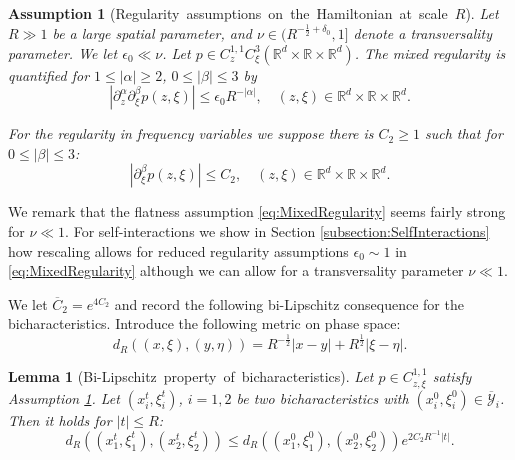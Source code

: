 \documentclass{amsart}
\newtheorem{lemma}[theorem]{Lemma}
\newtheorem{assumption}[theorem]{Assumption}
\theoremstyle{definition}
\newcommand{\R}{\mathbb{R}}
\begin{document}
\begin{assumption}[Regularity~assumptions~on~the~Hamiltonian~at~scale~$R$]
\label{ass:RegularityFlow}
Let $R \gg 1$ be a large spatial parameter, and $\nu \in (R^{-\frac{1}{2}+\delta_0},1]$ denote a transversality parameter. We let $\epsilon_0 \ll \nu$.
Let $p \in C_{z}^{1,1} C_{\xi}^3(\R^d \times \R \times \R^d)$. The mixed regularity is quantified for $1 \leq |\alpha| \geq 2$, $0 \leq |\beta| \leq 3$ by
\begin{equation}
\label{eq:MixedRegularity}
|\partial_z^\alpha \partial_\xi^{\beta} p(z,\xi)| \leq \epsilon_0 R^{-|\alpha|}, \quad (z,\xi) \in \R^d \times \R \times \R^d.
\end{equation}

For the regularity in frequency variables we suppose there is $C_2 \geq 1$ such that for $0 \leq |\beta| \leq 3$:
\begin{equation}
\label{eq:XiRegularity}
|\partial_{\xi}^{\beta} p(z,\xi)| \leq C_2, \quad (z,\xi) \in \R^d \times \R \times \R^d.
\end{equation}
\end{assumption}

We remark that the flatness assumption \eqref{eq:MixedRegularity} seems fairly strong for $\nu \ll 1$. For self-interactions we show in Section \ref{subsection:SelfInteractions} how rescaling allows for reduced regularity assumptions $\epsilon_0 \sim 1$ in \eqref{eq:MixedRegularity} although we can allow for a transversality parameter $\nu \ll 1$.

We let $\overline{C}_2 = e^{4 C_2}$ and record the following bi-Lipschitz consequence for the bicharacteristics. Introduce the following metric on phase space:
\begin{equation*}
    d_R((x,\xi),(y,\eta)) = R^{-\frac{1}{2}} |x-y| + R^{\frac{1}{2}} |\xi - \eta|.
\end{equation*}


\begin{lemma}[Bi-Lipschitz~property~of~bicharacteristics]
\label{lem:GeometryWavepackets}
Let $p \in C_{z,\xi}^{1,1}$ satisfy Assumption \ref{ass:RegularityFlow}. Let $(x_i^t,\xi_i^t)$, $i=1,2$ be two bicharacteristics with $(x_i^0,\xi_i^0) \in \overline{\mathcal{Y}}_i$.
Then it holds for $|t| \leq R$:
\begin{equation*}
d_R((x_1^t,\xi_1^t),(x_2^t,\xi_2^t)) \leq d_R((x_1^0,\xi_1^0),(x_2^0,\xi_2^0)) e^{2 C_2 R^{-1} |t|}.
\end{equation*}
\end{lemma}
\end{document}
